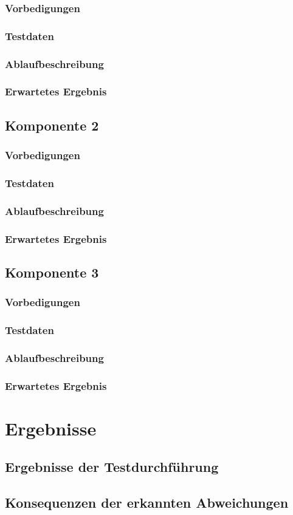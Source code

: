 \documentclass{article}
\begin{document}
\subsubsection{Vorbedigungen}
\subsubsection{Testdaten}
\subsubsection{Ablaufbeschreibung}
\subsubsection{Erwartetes Ergebnis}

\subsection{Komponente 2}
\subsubsection{Vorbedigungen}
\subsubsection{Testdaten}
\subsubsection{Ablaufbeschreibung}
\subsubsection{Erwartetes Ergebnis}

\subsection{Komponente 3}
\subsubsection{Vorbedigungen}
\subsubsection{Testdaten}
\subsubsection{Ablaufbeschreibung}
\subsubsection{Erwartetes Ergebnis}

\section{Ergebnisse}
\subsection{Ergebnisse der Testdurchführung}
\subsection{Konsequenzen der erkannten Abweichungen}
\end{document}
